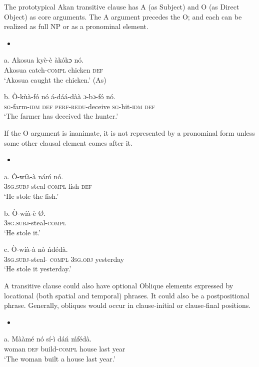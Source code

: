 \documentclass[output=paper]{langsci/langscibook}
\begin{document}
The prototypical Akan transitive clause has A (as Subject) and O (as Direct Object) as core arguments. The A argument precedes the O; and each can be realized as full NP or as a pronominal element.

\begin{itemize}
\item \end{itemize}
\gll a.  Akosua    ky\`{e}-\`{e}    \`{a}k\'{o}kɔ    n\'{o}.\\
       Akosua  catch-\textsc{compl}  chicken  \textsc{def}\\
\glt   ‘Akosua caught the chicken.’ (As)
\z

\gll  b.  \`{O}-k\`{u}\`{a}-f\'{o}    n\'{o}  \'{a}-d\'{a}\'{a}-d\`{a}\`{a}    ɔ{}-bɔ-f\'{o}    n\'{o}.\\
       \textsc{sg}{}-farm-\textsc{idm}    \textsc{def}  \textsc{perf-redu}{}-deceive  \textsc{sg}{}-hit-\textsc{idm}  \textsc{def}\\
\glt   ‘The farmer has deceived the hunter.’
\z

If the O argument is inanimate, it is not represented by a pronominal form unless some other clausal element comes after it.

\begin{itemize}
\item \end{itemize}
\gll a.  \`{O}-w\'{i}\`{a}-\`{a}    n\'{a}\'{m}  n\'{o}.\\
       \textsc{3sg.subj}{}-steal-\textsc{compl}  fish  \textsc{def}\\
\glt   ‘He stole the fish.’
\z

\gll  b.  \`{O}-w\'{i}\`{a}-\`{e}      Ø.\\
       \textsc{3sg.subj}{}-steal-\textsc{compl}\\
\glt   ‘He stole it.’
\z

\gll  c.  \`{O}-w\'{i}\`{a}-\`{a}      n\`{o}    \'{n}d\'{e}d\`{a}.\\
       \textsc{3sg.subj}{}-steal-\textsc{ compl}  \textsc{3sg.obj}  yesterday\\
\glt   ‘He stole it yesterday.’
\z

A transitive clause could also have optional Oblique elements expressed by locational (both spatial and temporal) phrases. It could also be a postpositional phrase. Generally, obliques would occur in clause-initial or clause-final positions. 

\begin{itemize}
\item \end{itemize}
\gll a.  M\`{a}\`{a}m\'{e}    n\'{o}  s\'{i}-\`{i}    d\'{a}\'{n}  \'{m}f\'{e}d\`{a}.\\
       woman    \textsc{def}  build-\textsc{compl}  house  last year\\
\glt   ‘The woman built a house last year.’
\z
\end{document}
